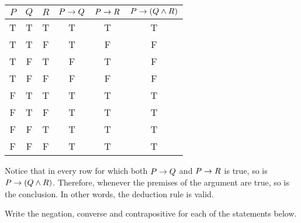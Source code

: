 \begin{questions}
\begin{answer}
    \begin{tabular}{c|c|c||c|c|c}
     $P$ & $Q$ & $R$ & $P \rightarrow Q$ & $P \rightarrow R$ & $P \rightarrow (Q \wedge R)$ \\ \hline
      T  &  T  &  T  &      T     &      T     &   T \\
      T  &  T  &  F  &      T     &      F     &   F \\
      T  &  F  &  T  &      F     &      T     &   F \\
      T  &  F  &  F  &      F     &      F     &   F \\
      F  &  T  &  T  &      T     &      T     &   T \\
      F  &  T  &  F  &      T     &      T     &   T \\
      F  &  F  &  T  &      T     &      T     &   T \\
      F  &  F  &  F  &      T     &      T     &   T 
    \end{tabular}
  
  Notice that in every row for which both $P \rightarrow Q$ and $P \rightarrow R$ is true, so is $P \rightarrow (Q \wedge R)$.  Therefore, whenever the premises of the argument are true, so is the conclusion.  In other words, the deduction rule is valid.
  \end{answer}



\question Write the negation, converse and contrapositive for each of the statements below.
\end{questions}

